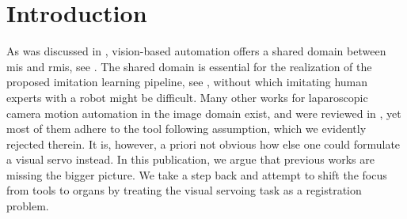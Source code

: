 



\section{Introduction}
\label{c2:sec:introduction}
As was discussed in , vision-based automation offers a shared domain between \acrshort{mis} and \acrshort{rmis}, see . The shared domain is essential for the realization of the proposed imitation learning pipeline, see , without which imitating human experts with a robot might be difficult. Many other works for laparoscopic camera motion automation in the image domain exist, and were reviewed in , yet most of them adhere to the tool following assumption, which we evidently rejected therein. It is, however, a priori not obvious how else one could formulate a visual servo instead. In this publication, we argue that previous works are missing the bigger picture. We take a step back and attempt to shift the focus from tools to organs by treating the visual servoing task as a registration problem.

